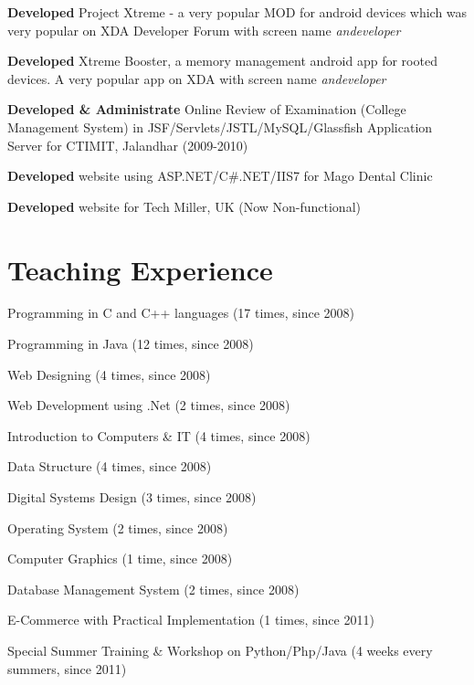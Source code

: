 \documentclass[margin,line]{res}
\begin{document}
\begin{resume}
\textbf{Developed} Project Xtreme - a very popular MOD for android devices which was very popular on XDA Developer Forum with screen name \textit{andeveloper}

\textbf{Developed} Xtreme Booster, a memory management android app for rooted devices. A very popular app on XDA with screen name \textit{andeveloper}

\textbf{Developed \& Administrate} Online Review of Examination (College Management System) in JSF/Servlets/JSTL/MySQL/Glassfish Application Server for CTIMIT, Jalandhar (2009-2010)

\textbf{Developed} website using ASP.NET/C\#.NET/IIS7 for Mago Dental Clinic

\textbf{Developed} website for Tech Miller, UK (Now Non-functional)

\section{\sc Teaching Experience}

Programming in C and C++ languages (17 times, since 2008)

Programming in Java (12 times, since 2008)

Web Designing (4 times, since 2008)

Web Development using .Net (2 times, since 2008)

Introduction to Computers \& IT (4 times, since 2008)

Data Structure (4 times, since 2008)

Digital Systems Design (3 times, since 2008)

Operating System (2 times, since 2008)

Computer Graphics (1 time, since 2008)

Database Management System (2 times, since 2008)

E-Commerce with Practical Implementation (1 times, since 2011)

Special Summer Training \& Workshop on Python/Php/Java (4 weeks every summers, since 2011)


\end{resume}
\end{document}
